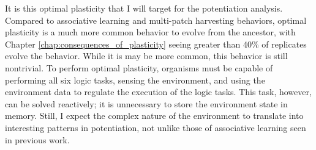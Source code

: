 It is this optimal plasticity that I will target for the potentiation analysis. 
Compared to associative learning and multi-patch harvesting behaviors, optimal plasticity is a much more common behavior to evolve from the ancestor, with Chapter \ref{chap:consequences_of_plasticity} seeing greater than 40\% of replicates evolve the behavior.
While it is may be more common, this behavior is still nontrivial. 
To perform optimal plasticity, organisms must be capable of performing all six logic tasks, sensing the environment, and using the environment data to regulate the execution of the logic tasks. 
This task, however, can be solved reactively; it is unnecessary to store the environment state in memory. 
Still, I expect the complex nature of the environment to translate into interesting patterns in potentiation, not unlike those of associative learning seen in previous work. 



